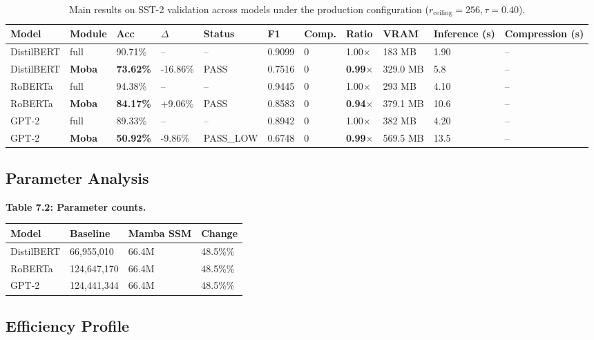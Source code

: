 \begin{table}[t]
\centering
\small
\begin{tabular}{lllllllllll}
\toprule
\textbf{Model} & \textbf{Module} & \textbf{Acc} & \textbf{$\Delta$} & \textbf{Status} & \textbf{F1} & \textbf{Comp.} & \textbf{Ratio} & \textbf{VRAM} & \textbf{Inference (s)} & \textbf{Compression (s)} \\
\midrule
DistilBERT & full & 90.71\% & -- & -- & 0.9099 & 0 & 1.00$\times$ & 183 MB & 1.90 & -- \\
DistilBERT & \textbf{Moba} & \textbf{73.62\%} & -16.86\% & PASS & 0.7516 & 0 & \textbf{0.99$\times$} & 329.0 MB & 5.8 & -- \\
RoBERTa & full & 94.38\% & -- & -- & 0.9445 & 0 & 1.00$\times$ & 293 MB & 4.10 & -- \\
RoBERTa & \textbf{Moba} & \textbf{84.17\%} & +9.06\% & PASS & 0.8583 & 0 & \textbf{0.94$\times$} & 379.1 MB & 10.6 & -- \\
GPT-2 & full & 89.33\% & -- & -- & 0.8942 & 0 & 1.00$\times$ & 382 MB & 4.20 & -- \\
GPT-2 & \textbf{Moba} & \textbf{50.92\%} & -9.86\% & PASS_LOW & 0.6748 & 0 & \textbf{0.99$\times$} & 569.5 MB & 13.5 & -- \\
\bottomrule
\end{tabular}
\caption{Main results on SST-2 validation across models under the production configuration ($r_{\mathrm{ceiling}}=256, \tau=0.40$).}
\label{tab:main_sst2}
\end{table}

\subsection{Parameter Analysis}

\textbf{Table 7.2: Parameter counts.}

\begin{table}[H]
\centering
\small
\begin{tabular}{llll}
\toprule
\textbf{Model} & \textbf{Baseline} & \textbf{Mamba SSM} & \textbf{Change} \\
\midrule
DistilBERT & 66,955,010 & 66.4M & 48.5\%\% \\
RoBERTa & 124,647,170 & 66.4M & 48.5\%\% \\
GPT-2 & 124,441,344 & 66.4M & 48.5\%\% \\
\bottomrule
\end{tabular}
\end{table}

\subsection{Efficiency Profile}

